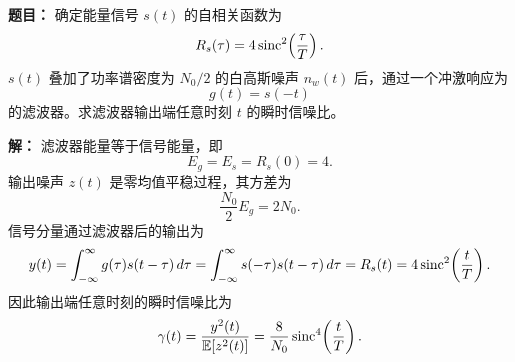 \medskip
{}
\textbf{题目：}
确定能量信号 $s(t)$ 的自相关函数为
\[
R_s(\tau)=4\operatorname{sinc}^2\!\left(\frac{\tau}{T}\right).
\]
$s(t)$ 叠加了功率谱密度为 $N_0/2$ 的白高斯噪声 $n_w(t)$ 后，通过一个冲激响应为
\[
g(t)=s(-t)
\]
的滤波器。求滤波器输出端任意时刻 $t$ 的瞬时信噪比。

\par\textbf{解：}
滤波器能量等于信号能量，即
\[
E_g=E_s=R_s(0)=4.
\]
输出噪声 $z(t)$ 是零均值平稳过程，其方差为
\[
\frac{N_0}{2}E_g=2N_0.
\]
信号分量通过滤波器后的输出为
\[
y(t)=\int_{-\infty}^{\infty}g(\tau)s(t-\tau)\,d\tau
=\int_{-\infty}^{\infty}s(-\tau)s(t-\tau)\,d\tau
=R_s(t)
=4\operatorname{sinc}^2\!\left(\frac{t}{T}\right).
\]
因此输出端任意时刻的瞬时信噪比为
\[
\gamma(t)=\frac{y^2(t)}{\mathbb{E}[z^2(t)]}
=\frac{8}{N_0}\operatorname{sinc}^4\!\left(\frac{t}{T}\right).
\]
